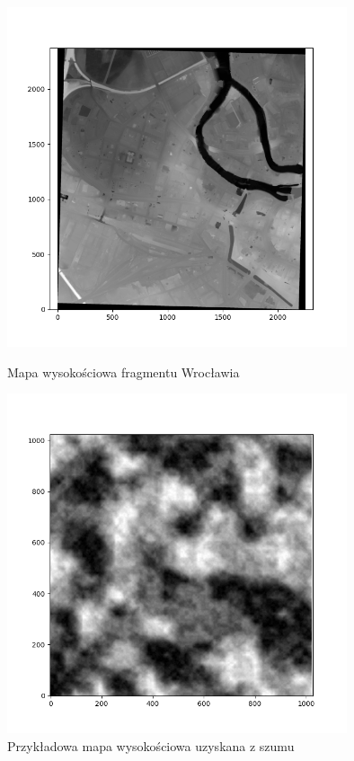 \begin{figure}[H]
	\begin{center}
		\includegraphics[width=10cm]{./przykladowa_mapa_wroclawia.png}
		\caption{Mapa wysokościowa fragmentu Wrocławia \cite{geoportal}}
		\label{przykladowa_mapa_wroclawia}
	\end{center}
\begin{center}
	\includegraphics[width=10cm]{./przykladowa_mapa_szumu.png}
	\caption{Przykładowa mapa wysokościowa uzyskana z szumu}
	\label{przykladowa_mapa_szumu}
\end{center}
\end{figure}

